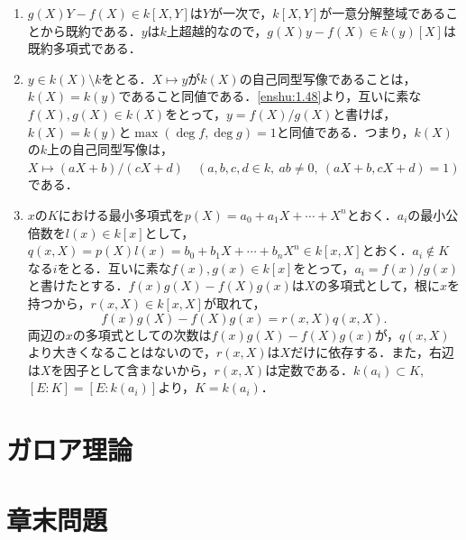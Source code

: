 \documentclass[a4paper,10pt]{ltjsarticle}
\begin{document}
\begin{enumerate}[]
\begin{align*}
    &= [E:E^p][E^p:k(x_1^p, \cdots, x_n^p)] \\
    \implies [E:E^p] &= p^n.
  \end{align*}
  \item \label{enshu:1.48} $g(X)Y - f(X) \in k[X, Y]$は$Y$が一次で，$k[X, Y]$が一意分解整域であることから既約である．$y$は$k$上超越的なので，$g(X)y-f(X) \in k(y)[X]$は既約多項式である．
  \item \label{enshu:1.49} $y \in k(X)\setminus k$をとる．$X\mapsto y$が$k(X)$の自己同型写像であることは，$k(X)=k(y)$であること同値である．\ref{enshu:1.48}より，互いに素な$f(X), g(X) \in k(X)$をとって，$y = f(X)/g(X)$と書けば，$k(X)=k(y)$と$\max(\deg f, \deg g) = 1$と同値である．つまり，$k(X)$の$k$上の自己同型写像は，$X \mapsto (aX+b)/(cX+d) \quad (a, b, c, d \in k,\ ab \ne 0,\ (aX+b, cX+d) = 1)$である．
  \item \label{enshu:1.50} $x$の$K$における最小多項式を$p(X) = a_0 + a_1X + \cdots + X^n$とおく．$a_i$の最小公倍数を$l(x)\in k[x]$として，$q(x, X) = p(X)l(x) = b_0 + b_1X + \cdots + b_nX^n \in k[x, X]$とおく．$a_i\notin K$なる$i$をとる．互いに素な$f(x), g(x) \in k[x]$をとって，$a_i = f(x)/g(x)$と書けたとする．$f(x)g(X)-f(X)g(x)$は$X$の多項式として，根に$x$を持つから，$r(x, X) \in k[x, X]$が取れて，
  \[ f(x)g(X) - f(X)g(x) = r(x, X)q(x, X). \]
  両辺の$x$の多項式としての次数は$f(x)g(X) - f(X)g(x)$が，$q(x, X)$より大きくなることはないので，$r(x, X)$は$X$だけに依存する．また，右辺は$X$を因子として含まないから，$r(x, X)$は定数である．$k(a_i) \subset K$, $[E:K] = [E:k(a_i)]$より，$K=k(a_i)$．
\end{enumerate}

\section{ガロア理論}

\section*{章末問題}
\end{document}
